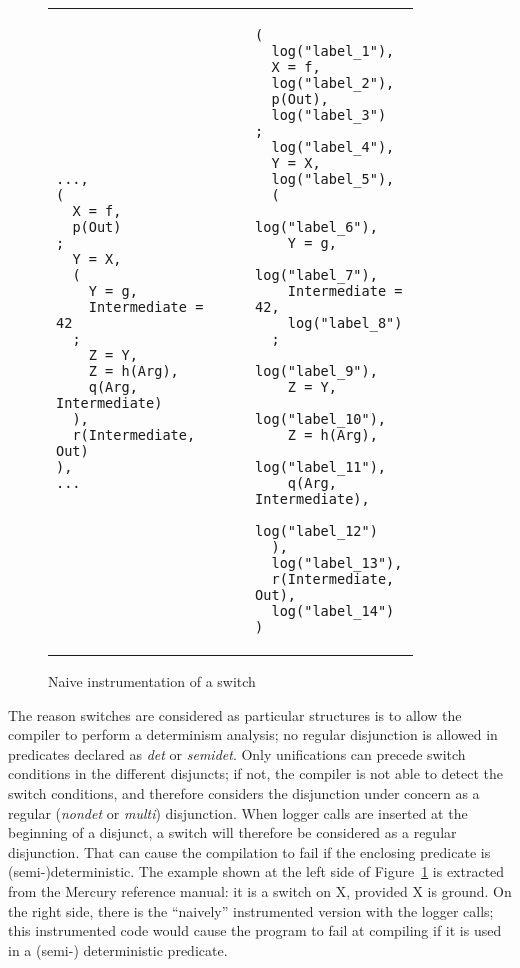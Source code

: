 \documentclass[british]{llncs}
\providecommand{\tabularnewline}{\\}
\begin{document}
\begin{figure}[th]
\begin{tabular}{>{\centering}p{0.4\linewidth}>{\centering}p{0.03\linewidth}|>{\centering}p{0.03\linewidth}>{\centering}p{0.4\linewidth}}
\begin{doublespace}

\begin{lstlisting}[basicstyle={\ttfamily},lineskip={-3pt},tabsize=4]
...,
(
  X = f,
  p(Out)
;
  Y = X,
  (
    Y = g,
    Intermediate = 42
  ;
    Z = Y,
    Z = h(Arg),
    q(Arg, Intermediate)
  ),
  r(Intermediate, Out)
),
...
\end{lstlisting}
\end{doublespace}
 &  &  & \begin{doublespace}

\begin{lstlisting}[basicstyle={\ttfamily},lineskip={-3pt},tabsize=4]
(
  log("label_1"),
  X = f,
  log("label_2"),
  p(Out),
  log("label_3")
;
  log("label_4"),
  Y = X,
  log("label_5"),
  (
    log("label_6"),
    Y = g,
    log("label_7"),
    Intermediate = 42,
    log("label_8")
  ;
    log("label_9"),
    Z = Y,
    log("label_10"),
    Z = h(Arg),
    log("label_11"),
    q(Arg, Intermediate),
    log("label_12")
  ),
  log("label_13"),
  r(Intermediate, Out),
  log("label_14")
)
\end{lstlisting}
\end{doublespace}
\tabularnewline
\end{tabular}

\caption{\label{fig:Instrumenting-a-switch}Naive instrumentation of a switch}

\end{figure}

The reason switches are considered as particular structures is to allow the compiler to perform a determinism analysis; no regular disjunction is allowed in predicates declared as \emph{det} or \emph{semidet}.
Only unifications can precede switch conditions in the different disjuncts; if not, the compiler is not able to detect the switch conditions, and therefore considers the disjunction under concern as a regular (\emph{nondet} or \emph{multi}) disjunction. 
When logger calls are inserted at the beginning of a disjunct, a switch
will therefore be considered as a regular disjunction. That can cause the compilation to fail if the enclosing predicate
is (semi-)deterministic. The example shown at the left side of Figure~\ref{fig:Instrumenting-a-switch}
is extracted from the Mercury reference manual: it is a switch on X, provided
X is ground. On the right side, there is the ``naively'' instrumented version with
the logger calls; this instrumented code would cause the program to fail at compiling if it is used in a (semi-) deterministic predicate.
\end{document}
